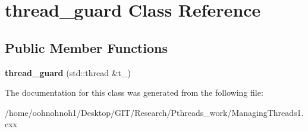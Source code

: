 \hypertarget{classthread__guard}{}\section{thread\+\_\+guard Class Reference}
\label{classthread__guard}
\subsection*{Public Member Functions}
\begin{DoxyCompactItemize}
\item 
\mbox{\label{classthread__guard_a4429daa8a5ac0284b12d02170f253823}} 
{\bfseries thread\+\_\+guard} (std\+::thread \&t\+\_\+)
\end{DoxyCompactItemize}


The documentation for this class was generated from the following file\+:\begin{DoxyCompactItemize}
\item 
/home/oohnohnoh1/\+Desktop/\+G\+I\+T/\+Research/\+Pthreads\+\_\+work/Managing\+Threads1.\+cxx\end{DoxyCompactItemize}
